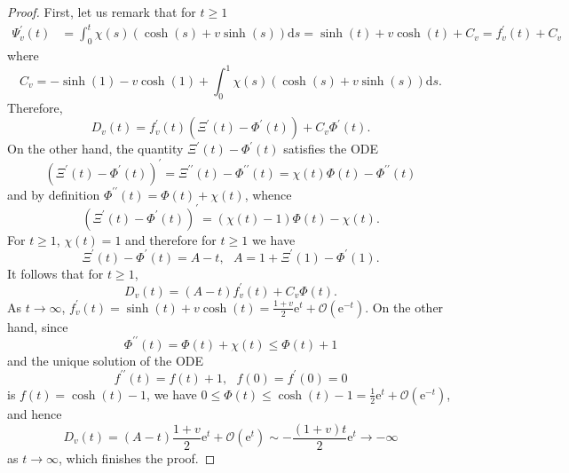 \documentclass{article}
\numberwithin{equation}{section}        %
\theoremstyle{bfnote}
\theoremstyle{definition}
\theoremstyle{bfremark}
\begin{document}
\begin{proof}
    First, let us remark that for $t \geq 1$
    \begin{align*}
        \Psi^\prime_v(t) & = \int_0^t \chi(s) (\cosh(s) + v \sinh(s)) \mathrm{d}s = \sinh(t) + v \cosh(t) + C_v = f^\prime_v(t) + C_v
    \end{align*}
    where 
    \begin{equation*}
        C_v = - \sinh(1) - v \cosh(1) + \int_0^1 \chi(s) (\cosh(s) + v \sinh(s)) \mathrm{d}s .
    \end{equation*}
    Therefore,
    \begin{equation*}
        D_v(t) = f^\prime_v(t) (\Xi^\prime(t)-\Phi^\prime(t)) + C_v \Phi^\prime(t) .
    \end{equation*}
    On the other hand, the quantity $\Xi^\prime(t) - \Phi^\prime(t)$ satisfies the ODE
    \begin{equation*}
        (\Xi^\prime(t)-\Phi^\prime(t))^\prime = \Xi^{\prime\prime}(t) - \Phi^{\prime\prime}(t) = \chi(t) \Phi(t) - \Phi^{\prime\prime}(t)
    \end{equation*}
    and by definition $\Phi^{\prime\prime}(t) = \Phi(t) + \chi(t)$, whence
    \begin{equation*}
        (\Xi^\prime(t)-\Phi^\prime(t))^\prime = (\chi(t)-1)\Phi(t) - \chi(t) .
    \end{equation*}
    For $t \geq 1$, $\chi(t) = 1$ and therefore for $t \geq 1$ we have
    \begin{equation*}
        \Xi^\prime(t)-\Phi^\prime(t) = A - t , ~~~ A = 1 + \Xi^\prime(1) - \Phi^\prime(1) .
    \end{equation*}
    It follows that for $t \geq 1$, 
    \begin{equation*}
        D_v(t) = (A- t) f^\prime_v(t) + C_v \Phi(t) .
    \end{equation*}
    As $t \rightarrow \infty$, $f^\prime_v(t) = \sinh(t) + v \cosh(t) = \frac{1+v}{2} \mathrm{e}^t + \mathcal{O}(\mathrm{e}^{-t})$. On the other hand, since 
    \begin{equation*}
        \Phi^{\prime\prime}(t) = \Phi(t) + \chi(t) \leq \Phi(t) + 1
    \end{equation*}
    and the unique solution of the ODE
    \begin{equation*}
        f^{\prime\prime}(t) = f(t) + 1, ~~~ f(0) = f^\prime(0) = 0
    \end{equation*}
    is $f(t) =\cosh(t)-1$, we have $0 \leq \Phi(t) \leq \cosh(t)-1 = \frac{1}{2}\mathrm{e}^t + \mathcal{O}(\mathrm{e}^{-t})$, and hence
    \begin{equation*}
        D_v(t) = (A-t) \frac{1+v}{2} \mathrm{e}^t + \mathcal{O}(\mathrm{e}^t) \sim -\frac{(1+v)t}{2} \mathrm{e}^t \rightarrow - \infty
    \end{equation*}
    as $t \rightarrow \infty$, which finishes the proof.
\end{proof}
\end{document}
